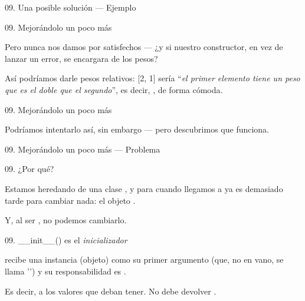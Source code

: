 \begin{frame}{09. Una posible solución — Ejemplo}
  \scriptsize
\end{frame}

\begin{frame}{09. Mejorándolo un poco más}
  \begin{block}{}
    \centering
    Pero nunca nos damos por satisfechos — ¿y si nuestro constructor,
    en vez de lanzar un error, se encargara de 
    los pesos?
  \end{block}

  \begin{center}
    \small
    Así podríamos darle pesos relativos: [2, 1] sería ``\textit{el
      primer elemento tiene un peso que es el doble que el segundo}'',
    es decir, \structure{[0.66, 0.33]}, de forma cómoda.
  \end{center}
\end{frame}

\begin{frame}{09. Mejorándolo un poco más}
  \begin{alertblock}{}
    \centering
    \large
    Podríamos intentarlo así, sin embargo — pero descubrimos que
     funciona.
  \end{alertblock}
\end{frame}

\begin{frame}{\large 09. Mejorándolo un poco más — Problema}
  \footnotesize
\end{frame}

\begin{frame}{09. ¿Por qué?}
  \begin{block}{}
    \centering
    Estamos heredando de una clase , y para
    cuando llegamos a  ya es demasiado tarde
    para cambiar nada: el objeto .
  \end{block}

  \begin{center}
    Y, al ser , no podemos cambiarlo.
  \end{center}
\end{frame}

\begin{frame}{09. \_\_init\_\_() es el \textit{inicializador}}
  \begin{alertblock}{}
    \centering
     recibe una instancia (objeto) como su
    primer argumento (que, no en vano, se llama '') y
    su responsabilidad es .
  \end{alertblock}

  \begin{center}
    Es decir,  a los valores que
    deban tener. No debe devolver .
  \end{center}
\end{frame}

